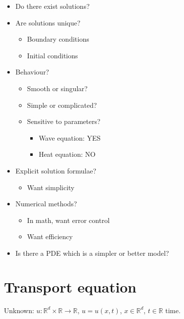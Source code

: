 \documentclass[12pt]{article}
\theoremstyle{definition}
\begin{document}
\begin{itemize}
\item Do there exist solutions?

\item Are solutions unique?

\begin{itemize}
\item Boundary conditions

\item Initial conditions
\end{itemize}

\item Behaviour?

\begin{itemize}
\item Smooth or singular?

\item Simple or complicated?

\item Sensitive to parameters?

\begin{itemize}
\item Wave equation: YES

\item Heat equation: NO
\end{itemize}
\end{itemize}

\item Explicit solution formulae?

\begin{itemize}
\item Want simplicity
\end{itemize}

\item Numerical methods?

\begin{itemize}
\item In math, want error control

\item Want efficiency
\end{itemize}

\item Is there a PDE which is a simpler or better model?
\end{itemize}

\renewcommand{\theHsection}{introduction.\thesection}
\renewcommand{\thesection}{\arabic{section}}
\setcounter{section}{0}
\section{Transport equation}\label{transport_eq}
Unknown: $u:\mathbb{R}^d\times\mathbb{R}\rightarrow\mathbb{R}$, $u=u(x,t)$, $x\in\mathbb{R}^d$, $t\in\mathbb{R}$ time.
\end{document}
